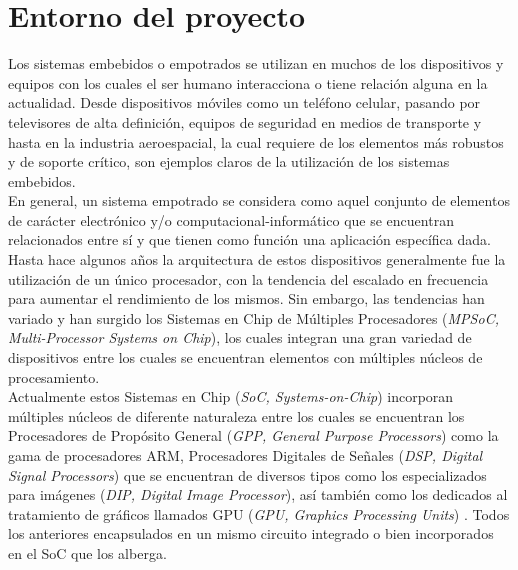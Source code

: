 
\chapter{Entorno del proyecto}
\label{ch:Entorno_del_proyecto}

Los sistemas embebidos o empotrados se utilizan en muchos de los dispositivos
y equipos con los cuales el ser humano interacciona o tiene relación alguna en la actualidad. Desde dispositivos
móviles como un teléfono celular, pasando por televisores de alta definición, equipos de seguridad
en medios de transporte y hasta en la industria aeroespacial, la cual requiere de los elementos más robustos
y de soporte crítico, son ejemplos claros de la utilización de los sistemas embebidos.\\

En general, un sistema empotrado se considera como aquel conjunto de elementos de carácter electrónico y/o
computacional-informático que  se encuentran relacionados entre sí y que tienen como función una aplicación 
específica dada.\cite {LERTA} \cite{MK1} \\

Hasta hace algunos años la arquitectura de estos dispositivos generalmente fue la utilización de un único procesador, 
con la tendencia del escalado en frecuencia \cite{TAODES} para aumentar el rendimiento de los mismos. Sin embargo,
las tendencias han variado y han surgido los Sistemas en Chip de Múltiples Procesadores 
(\textit{MPSoC, Multi-Processor Systems on Chip}), los cuales integran una gran variedad de dispositivos entre los cuales
se encuentran elementos con múltiples núcleos de procesamiento.\\ 

Actualmente estos Sistemas en Chip (\textit{SoC, Systems-on-Chip}) incorporan 
múltiples núcleos de diferente naturaleza entre los cuales se encuentran los Procesadores de Propósito 
General (\textit{GPP, General Purpose Processors}) como la gama de procesadores ARM, Procesadores Digitales de 
Señales (\textit{DSP, Digital Signal Processors}) que se encuentran de diversos tipos como los 
especializados para imágenes (\textit{DIP, Digital Image Processor}), así también como los dedicados al tratamiento de gráficos llamados 
GPU (\textit{GPU, Graphics Processing Units}) \cite{MK2}. Todos los anteriores encapsulados en un mismo circuito integrado o bien 
incorporados en el SoC que los alberga.\\

